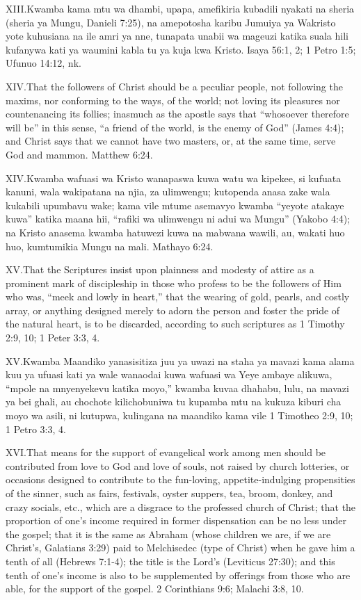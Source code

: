 \lettrine{XIII.} Kwamba kama mtu wa dhambi, upapa, amefikiria kubadili nyakati na sheria (sheria ya Mungu, Danieli 7:25), na amepotosha karibu Jumuiya ya Wakristo yote kuhusiana na ile amri ya nne, tunapata unabii wa mageuzi katika suala hili kufanywa kati ya waumini kabla tu ya kuja kwa Kristo. Isaya 56:1, 2; 1 Petro 1:5; Ufunuo 14:12, nk.


\lettrine{XIV.} That the followers of Christ should be a peculiar people, not following the maxims, nor conforming to the ways, of the world; not loving its pleasures nor countenancing its follies; inasmuch as the apostle says that “whosoever therefore will be” in this sense, “a friend of the world, is the enemy of God” (James 4:4); and Christ says that we cannot have two masters, or, at the same time, serve God and mammon. Matthew 6:24.


\lettrine{XIV.} Kwamba wafuasi wa Kristo wanapaswa kuwa watu wa kipekee, si kufuata kanuni, wala wakipatana na njia, za ulimwengu; kutopenda anasa zake wala kukabili upumbavu wake; kama vile mtume asemavyo kwamba “yeyote atakaye kuwa” katika maana hii, “rafiki wa ulimwengu ni adui wa Mungu” (Yakobo 4:4); na Kristo anasema kwamba hatuwezi kuwa na mabwana wawili, au, wakati huo huo, kumtumikia Mungu na mali. Mathayo 6:24.


\lettrine{XV.} That the Scriptures insist upon plainness and modesty of attire as a prominent mark of discipleship in those who profess to be the followers of Him who was, “meek and lowly in heart,” that the wearing of gold, pearls, and costly array, or anything designed merely to adorn the person and foster the pride of the natural heart, is to be discarded, according to such scriptures as 1 Timothy 2:9, 10; 1 Peter 3:3, 4.


\lettrine{XV.} Kwamba Maandiko yanasisitiza juu ya uwazi na staha ya mavazi kama alama kuu ya ufuasi kati ya wale wanaodai kuwa wafuasi wa Yeye ambaye alikuwa, “mpole na mnyenyekevu katika moyo,” kwamba kuvaa dhahabu, lulu, na mavazi ya bei ghali, au chochote kilichobuniwa tu kupamba mtu na kukuza kiburi cha moyo wa asili, ni kutupwa, kulingana na maandiko kama vile 1 Timotheo 2:9, 10; 1 Petro 3:3, 4.


\lettrine{XVI.} That means for the support of evangelical work among men should be contributed from love to God and love of souls, not raised by church lotteries, or occasions designed to contribute to the fun-loving, appetite-indulging propensities of the sinner, such as fairs, festivals, oyster suppers, tea, broom, donkey, and crazy socials, etc., which are a disgrace to the professed church of Christ; that the proportion of one’s income required in former dispensation can be no less under the gospel; that it is the same as Abraham (whose children we are, if we are Christ’s, Galatians 3:29) paid to Melchisedec (type of Christ) when he gave him a tenth of all (Hebrews 7:1-4); the title is the Lord’s (Leviticus 27:30); and this tenth of one’s income is also to be supplemented by offerings from those who are able, for the support of the gospel. 2 Corinthians 9:6; Malachi 3:8, 10.


